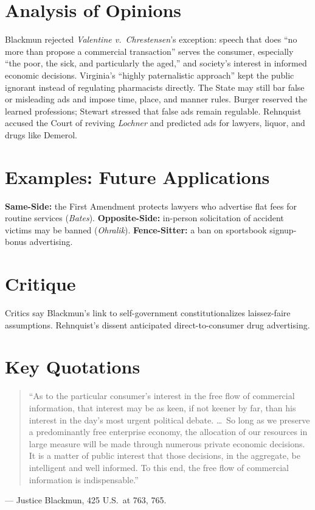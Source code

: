 \documentclass[12pt]{article}
\begin{document}
\section{Analysis of Opinions}
Blackmun rejected \textit{Valentine v.\ Chrestensen}'s exception: speech that does ``no more than propose a commercial transaction'' serves the consumer, especially ``the poor, the sick, and particularly the aged,'' and society's interest in informed economic decisions. Virginia's ``highly paternalistic approach'' kept the public ignorant instead of regulating pharmacists directly. The State may still bar false or misleading ads and impose time, place, and manner rules. Burger reserved the learned professions; Stewart stressed that false ads remain regulable. Rehnquist accused the Court of reviving \textit{Lochner} and predicted ads for lawyers, liquor, and drugs like Demerol.

\section{Examples: Future Applications}
\textbf{Same-Side:} the First Amendment protects lawyers who advertise flat fees for routine services (\textit{Bates}). \textbf{Opposite-Side:} in-person solicitation of accident victims may be banned (\textit{Ohralik}). \textbf{Fence-Sitter:} a ban on sportsbook signup-bonus advertising.

\section{Critique}
Critics say Blackmun's link to self-government constitutionalizes laissez-faire assumptions. Rehnquist's dissent anticipated direct-to-consumer drug advertising.

\section{Key Quotations}
\begin{quote}
``As to the particular consumer's interest in the free flow of commercial information, that interest may be as keen, if not keener by far, than his interest in the day's most urgent political debate. \dots\ So long as we preserve a predominantly free enterprise economy, the allocation of our resources in large measure will be made through numerous private economic decisions. It is a matter of public interest that those decisions, in the aggregate, be intelligent and well informed. To this end, the free flow of commercial information is indispensable.''
\end{quote}
\noindent --- Justice Blackmun, 425 U.S.\ at 763, 765.
\end{document}

